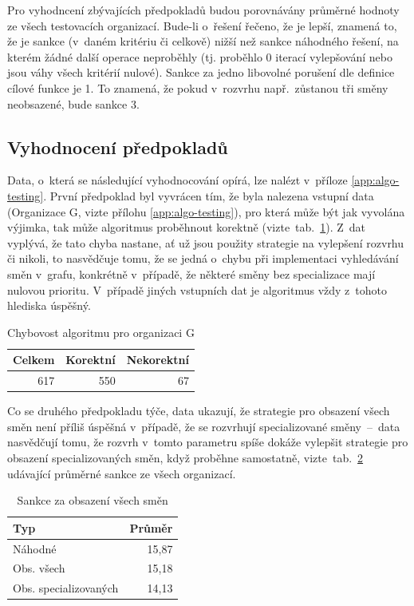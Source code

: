 \documentclass[a4paper,11pt,openany,twoside]{book}
\begin{document}
Pro vyhodncení zbývajících předpokladů budou porovnávány průměrné hodnoty ze všech testovacích organizací. Bude-li o~řešení řečeno, že je lepší, znamená to, že je sankce (v~daném kritériu či celkově) nižší než sankce náhodného řešení, na kterém žádné další operace neproběhly (tj. proběhlo 0 iterací vylepšování nebo jsou váhy všech kritérií nulové). Sankce za jedno libovolné porušení dle definice cílové funkce je 1. To znamená, že pokud v~rozvrhu např.~zůstanou tři směny neobsazené, bude sankce 3.

\subsection{Vyhodnocení předpokladů}
Data, o~která se následující vyhodnocování opírá, lze nalézt v~příloze \ref{app:algo-testing}. První předpoklad byl vyvrácen tím, že byla nalezena vstupní data (Organizace G, vizte přílohu \ref{app:algo-testing}), pro která může být jak vyvolána výjimka, tak může algoritmus proběhnout korektně (vizte~tab.~\ref{tab:errors}). Z~dat vyplývá, že tato chyba nastane, ať už jsou použity strategie na vylepšení rozvrhu či nikoli, to nasvědčuje tomu, že se jedná o~chybu při implementaci vyhledávání směn v~grafu, konkrétně v~případě, že některé směny bez specializace mají nulovou prioritu. V~případě jiných vstupních dat je algoritmus vždy z~tohoto hlediska úspěšný.

\begin{table}[h]
	\centering
	\caption{Chybovost algoritmu pro organizaci G}
	\label{tab:errors}
	\begin{tabular}{r|rr}
		\hline
		\textbf{Celkem} & \textbf{Korektní} & \textbf{Nekorektní}\\
		\hline
		\rowcolor{Gray}
		617 & 550 & 67\\
		\hline
	\end{tabular}
\end{table}

Co se druhého předpokladu týče, data ukazují, že strategie pro obsazení všech směn není příliš úspěšná v~případě, že se rozvrhují specializované směny~–~data nasvědčují tomu, že rozvrh v~tomto parametru spíše dokáže vylepšit strategie pro obsazení specializovaných směn, když proběhne samostatně, vizte~tab.~\ref{tab:empty} udávající průměrné sankce ze všech organizací.

\begin{table}[h]
	\centering
	\caption{Sankce za obsazení všech směn}
	\label{tab:empty}
	\begin{tabular}{lr}
		\hline
		\textbf{Typ} & \textbf{Průměr}\\
		\hline
		\rowcolor{Gray}
		Náhodné & 15,87\\
		Obs. všech & 15,18 \\
		\rowcolor{Gray}
		Obs. specializovaných & 14,13\\
		\hline
	\end{tabular}
\end{table}
\end{document}

